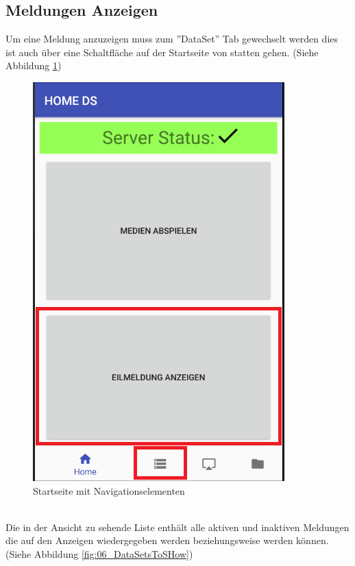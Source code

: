 \subsection{Meldungen Anzeigen}
Um eine Meldung anzuzeigen muss zum ''DataSet'' Tab gewechselt werden dies ist auch über eine Schaltfläche auf der Startseite von statten gehen. (Siehe Abbildung \ref{fig:06_dataSetNavigation})
\begin{figure}[H]
\centering
\includegraphics[scale=0.35]{images/06_AndroidApp/06_dataSetNavigation}
\caption{Startseite mit Navigationselementen}
\label{fig:06_dataSetNavigation}
\end{figure}
\\
Die in der Ansicht zu sehende Liste enthält alle aktiven und  inaktiven Meldungen die auf den Anzeigen wiedergegeben werden beziehungsweise werden können.
(Siehe Abbildung \ref{fig:06_DataSetsToSHow}) 
\\
